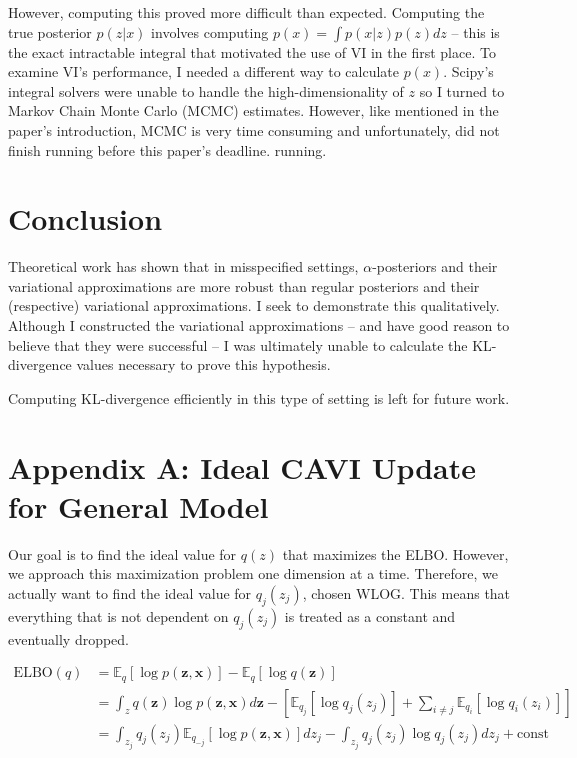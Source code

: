 \documentclass[letterpaper,12pt]{article}
\newcommand{\lb}{\left [} %
\newcommand{\rb}{\right ]} %
\newcommand{\pzx}{\ensuremath{p(\boldsymbol{z}, \boldsymbol{x})}}
\newcommand{\qz}{\ensuremath{q(\boldsymbol{z})}}
\newcommand{\z}{\mathbf{z}}
\newcommand{\elboq}{\ensuremath{\mathrm{ELBO}(q)}}
\newcommand{\E}{\mathbb{E}_q}
\newcommand{\el}{\left[} %
\newcommand{\er}{\right]} %
\begin{document}
However, computing this proved more difficult than expected. Computing the true posterior $p(z|x)$ involves computing $p(x) = \int p(x|z)p(z) dz$ -- this is the exact intractable integral that motivated the use of VI in the first place. To examine VI's performance, I needed a different way to calculate $p(x)$. Scipy's integral solvers were unable to handle the high-dimensionality of $z$ so I turned to Markov Chain Monte Carlo (MCMC) estimates. However, like mentioned in the paper's introduction, MCMC is very time consuming and unfortunately, did not finish running before this paper's deadline. running.

\section{Conclusion}
Theoretical work has shown that in misspecified settings, $\alpha$-posteriors and their variational approximations are more robust than regular posteriors and their (respective) variational approximations. I seek to demonstrate this qualitatively. Although I constructed the variational approximations -- and have good reason to believe that they were successful -- I was ultimately unable to calculate the KL-divergence values necessary to prove this hypothesis. 

Computing KL-divergence efficiently in this type of setting is left for future work.

\section{Appendix A: Ideal CAVI Update for General Model}

Our goal is to find the ideal value for $q(z)$ that maximizes the ELBO. However, we approach this maximization problem one dimension at a time. Therefore, we actually want to find the ideal value for $q_j(z_j)$, chosen WLOG. This means that everything that is not dependent on $q_j(z_j)$ is treated as a constant and eventually dropped.

\begin{equation}
\begin{split}
    \elboq &= \E \el \log \pzx \er - \E \el \log \qz \er \\
    &= \int_z q(\z) \log \pzx d\z - \lb \mathbb{E}_{q_j} \el \log q_j(z_j) \er + \sum_{i \neq j} \mathbb{E}_{q_i} \el \log q_i(z_i) \er \rb \\ 
    &= \int_{z_j} q_j(z_j) \mathbb{E}_{q_{-j}} \el \log \pzx \er dz_j - \int_{z_j} q_j(z_j) \log q_j(z_j) dz_j + \textrm{const} \\
\end{split}
\end{equation}
\end{document}
